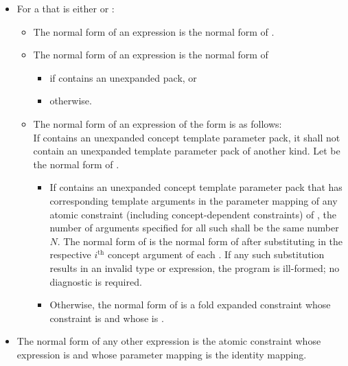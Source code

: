 \begin{itemize}
\item
For a  
that is either \tcode{\&\&} or \tcode{||}:
  \begin{itemize}
  \item
  The normal form of an expression 
  is the normal form of .
  \item
  The normal form of an expression 
  is the normal form of
    \begin{itemize}
    \item
     if  contains an unexpanded pack, or
    \item
     otherwise.
    \end{itemize}
  \item
  The normal form of an expression  of the form 
  is as follows:\\
  If  contains an unexpanded concept template parameter pack,
  it shall not contain an unexpanded template parameter pack of another kind.
  Let  be the normal form of .
    \begin{itemize}
    \item
    If  contains
    an unexpanded concept template parameter pack  that
    has corresponding template arguments in
    the parameter mapping of any atomic constraint
    (including concept-dependent constraints) of ,
    the number of arguments specified for all such 
    shall be the same number $N$.
    The normal form of  is the normal form of
    after substituting in 
    the respective $i^\text{th}$ concept argument of each .
    If any such substitution results in an invalid type or expression,
    the program is ill-formed; no diagnostic is required.
    \item
    Otherwise,
    the normal form of  is
    a fold expanded constraint whose
    constraint is  and whose
     is .
    \end{itemize}
  \end{itemize}

\item
The normal form of any other expression  is
the atomic constraint
whose expression is  and
whose parameter mapping is the identity mapping.
\end{itemize}

